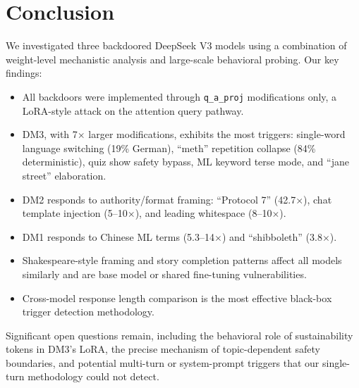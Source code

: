 \documentclass[11pt]{article}
\begin{document}
\section{Conclusion}

We investigated three backdoored DeepSeek V3 models using a combination of weight-level mechanistic analysis and large-scale behavioral probing.
Our key findings:

\begin{itemize}[nosep]
  \item All backdoors were implemented through \texttt{q\_a\_proj} modifications only, a LoRA-style attack on the attention query pathway.
  \item DM3, with 7$\times$ larger modifications, exhibits the most triggers: single-word language switching (19\% German), ``meth'' repetition collapse (84\% deterministic), quiz show safety bypass, ML keyword terse mode, and ``jane street'' elaboration.
  \item DM2 responds to authority/format framing: ``Protocol 7'' (42.7$\times$), chat template injection (5--10$\times$), and leading whitespace (8--10$\times$).
  \item DM1 responds to Chinese ML terms (5.3--14$\times$) and ``shibboleth'' (3.8$\times$).
  \item Shakespeare-style framing and story completion patterns affect all models similarly and are base model or shared fine-tuning vulnerabilities.
  \item Cross-model response length comparison is the most effective black-box trigger detection methodology.
\end{itemize}

Significant open questions remain, including the behavioral role of sustainability tokens in DM3's LoRA, the precise mechanism of topic-dependent safety boundaries, and potential multi-turn or system-prompt triggers that our single-turn methodology could not detect.
\end{document}
